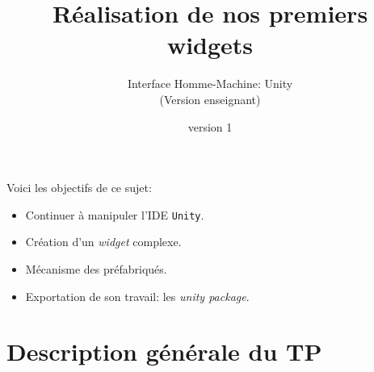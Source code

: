 \documentclass[a4paper,10pt]{article}
\newenvironment{attention}%
{\begin{tcolorbox}[breakable,colback=green!25!white,colframe=red!55!black,title=Attention]}%
{\end{tcolorbox}}
\begin{document}
	


\title{\vspace*{-1cm}Réalisation de nos premiers widgets}
\author{\vspace*{-1.5cm}Interface Homme-Machine: Unity
\begin{ensnote}
	(Version enseignant)
\end{ensnote}
}
\date{\vspace*{-1.5cm}version 1}
\maketitle
\thispagestyle{fancy}

Voici les objectifs de ce sujet:
\begin{itemize}
	\item Continuer à manipuler l'IDE \texttt{Unity}.
	\item Création d'un \textit{widget} complexe.
	\item Mécanisme des préfabriqués.
	\item Exportation de son travail: les \textit{unity package}.
\end{itemize}


%	

\section*{Description générale du TP}

\end{document}
